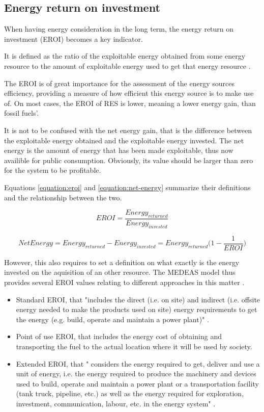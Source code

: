 \subsection{Energy return on investment}

When having energy consideration in the long term, the energy return on investment (EROI) becomes a key indicator.

It is defined as the ratio of the exploitable energy obtained from some energy resource to the amount of exploitable energy used to get that energy resource \cite{wiki-eroi}.

The EROI is of great importance for the assessment of the energy sources efficiency, providing a measure of how efficient this energy source is to make use of. On most cases, the EROI of RES is lower, meaning a lower energy gain, than fossil fuels'.

It is not to be confused with the net energy gain, that is the difference between the exploitable energy obtained and the exploitable energy invested. The net energy is the amount of energy that has been made exploitable, thus now availible for public consumption. Obviously, its value should be larger than zero for the system to be profitable.

Equations \ref{equation:eroi} and \ref{equation:net-energy} summarize their definitions and the relationship between the two.

\begin{equation}
    EROI=\frac{Energy_{returned}}{Energy_{invested}}
    \label{equation:eroi}
\end{equation}

\begin{equation}
    NetEnergy = Energy_{returned} - Energy_{invested} = Energy_{returned} \Big( 1 - \frac{1}{EROI}\Big)
    \label{equation:net-energy}
\end{equation}

However, this also requires to set a definition on what exactly is the energy invested on the aquisition of an other resource. The MEDEAS model thus provides several EROI values relating to different approaches in this matter \cite{medeas-cost-of-transition}.
\begin{itemize}
    \item Standard EROI, that "includes the direct (i.e. on site) and indirect (i.e. offsite energy needed to make the products used on site) energy requirements to get the energy (e.g. build, operate and maintain a power plant)" \cite{medeas-cost-of-transition}.
    \item Point of use EROI, that includes the energy cost of obtaining and transporting the fuel to the actual location where it will be used by society.
    \item Extended EROI, that " considers the energy required to get, deliver and use a unit of energy, i.e. the energy required to produce the machinery and devices used to build, operate and maintain a power plant or a transportation facility (tank truck, pipeline, etc.) as well as the energy required for exploration, investment, communication, labour, etc. in the energy system" \cite{medeas-cost-of-transition}.
\end{itemize}

